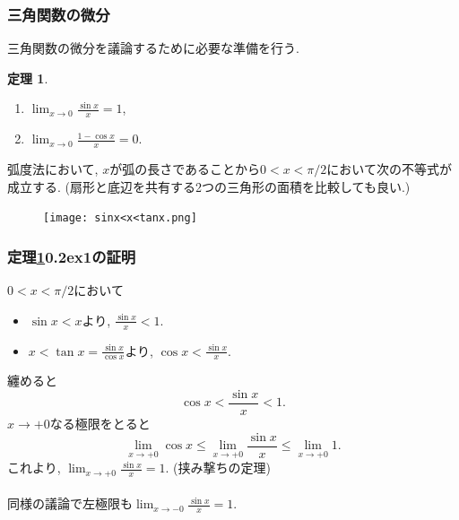 \documentclass[dvipdfmx,cjk,10.2pt]{beamer}
\newcommand{\ctext}[1]{\raise0.2ex\hbox{\textcircled{\scriptsize{#1}}}}
\theoremstyle{definition}
\newtheorem{Thm}{定理}[section]
\begin{document}
\begin{frame}
\frametitle{三角関数の微分}


\vspace{-4mm}

三角関数の微分を議論するために必要な準備を行う. 

\vspace{-1mm}

\begin{Thm} \label{準備}
\begin{enumerate}
\item $\displaystyle\lim_{x \to 0} \frac{\sin x}{x}=1$, 
\item  $\displaystyle \lim_{x \to 0} \frac{1-\cos x}{x}=0$. 
\end{enumerate}
\end{Thm}
弧度法において, $x$が弧の長さであることから$0<x<\pi/2$において次の不等式が成立する. 
(扇形と底辺を共有する2つの三角形の面積を比較しても良い.)
\vspace{-6mm}

 \begin{figure}[htbp]
 \begin{center} 
  \texttt{[image: sinx<x<tanx.png]}
 \end{center}
\end{figure}

\vspace{-10mm}

\end{frame}







\begin{frame}
\frametitle{定理\ref{準備}\ctext{1}の証明}

$0<x<\pi/2$において
\begin{itemize}
\item $\sin x < x$より, $\frac{\sin x}{x}<1$. 
\item $x < \tan x=\frac{\sin x}{\cos x}$より, $\cos x < \frac{\sin x}{x}$.   
\end{itemize}
纏めると
$$
\cos x < \frac{\sin x}{x} < 1. 
$$
$x \to +0$なる極限をとると
$$
\lim_{x \to +0} \cos x \le \lim_{x \to +0} \frac{\sin x}{x} \le \lim_{x \to +0} 1. 
$$
これより, $\displaystyle\lim_{x \to +0} \frac{\sin x}{x}=1$. (挟み撃ちの定理)\\
\ \\

同様の議論で左極限も$\displaystyle\lim_{x \to -0} \frac{\sin x}{x}=1$.  

\end{frame}
\end{document}

